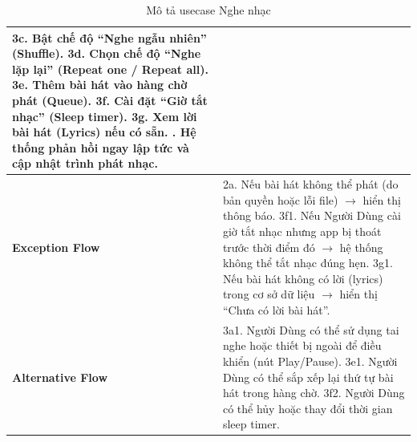 \documentclass[a4paper]{article}
\newcommand{\cach}{\hspace*{1.5em}\ignorespaces}
\begin{document}
\begin{table}[h!]
\begin{tabularx}{\textwidth}{|l|X|}
  \cach 3c. Bật chế độ “Nghe ngẫu nhiên” (Shuffle). \newline
  \cach 3d. Chọn chế độ “Nghe lặp lại” (Repeat one / Repeat all). \newline
  \cach 3e. Thêm bài hát vào hàng chờ phát (Queue). \newline
  \cach 3f. Cài đặt “Giờ tắt nhạc” (Sleep timer). \newline
  \cach 3g. Xem lời bài hát (Lyrics) nếu có sẵn. \newline
  4. Hệ thống phản hồi ngay lập tức và cập nhật trình phát nhạc. \\ \hline
\textbf{Exception Flow} 
& 2a. Nếu bài hát không thể phát (do bản quyền hoặc lỗi file) $\rightarrow$  hiển thị thông báo. \newline
  3f1. Nếu Người Dùng cài giờ tắt nhạc nhưng app bị thoát trước thời điểm đó $\rightarrow$ hệ thống không thể tắt nhạc đúng hẹn. \newline
  3g1. Nếu bài hát không có lời (lyrics) trong cơ sở dữ liệu $\rightarrow$ hiển thị “Chưa có lời bài hát”. \\ \hline
\textbf{Alternative Flow} 
& 3a1. Người Dùng có thể sử dụng tai nghe hoặc thiết bị ngoài để điều khiển (nút Play/Pause). \newline
  3e1. Người Dùng có thể sắp xếp lại thứ tự bài hát trong hàng chờ. \newline
  3f2. Người Dùng có thể hủy hoặc thay đổi thời gian sleep timer. \\ \hline
\end{tabularx}
\caption{Mô tả usecase Nghe nhạc}
\end{table}
\end{document}
